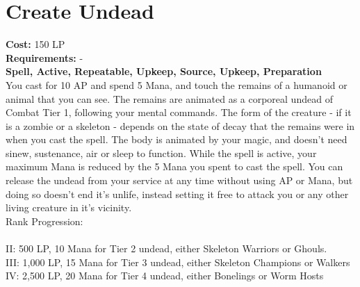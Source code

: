 \section{Create Undead}\label{spell:createUndead}
\textbf{Cost:} 150 LP\\
\textbf{Requirements:} -\\
\textbf{Spell, Active, Repeatable, Upkeep, Source, Upkeep, Preparation}\\
You cast for 10 AP and spend 5 Mana, and touch the remains of a humanoid or animal that you can see.
The remains are animated as a corporeal undead of Combat Tier 1, following your mental commands.
The form of the creature - if it is a zombie or a skeleton - depends on the state of decay that the remains were in when you cast the spell.
The body is animated by your magic, and doesn't need sinew, sustenance, air or sleep to function.
While the spell is active, your maximum Mana is reduced by the 5 Mana you spent to cast the spell.
You can release the undead from your service at any time without using AP or Mana, but doing so doesn't end it's unlife, instead setting it free to attack you or any other living creature in it's vicinity.
\\
Rank Progression:\\
\\
II: 500 LP, 10 Mana for Tier 2 undead, either Skeleton Warriors or Ghouls.\\
III: 1,000 LP, 15 Mana for Tier 3 undead, either Skeleton Champions or Walkers\\
IV: 2,500 LP, 20 Mana for Tier 4 undead, either Bonelings or Worm Hosts\\
